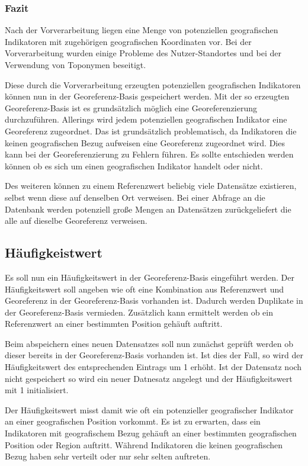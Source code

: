 			\subsubsection{Fazit} 

				Nach der Vorverarbeitung liegen eine Menge von potenziellen geografischen Indikatoren mit zugehörigen geografischen Koordinaten vor.
				Bei der Vorverarbeitung wurden einige Probleme des Nutzer-Standortes und bei der Verwendung von Toponymen beseitigt.

				Diese durch die Vorverarbeitung erzeugten potenziellen geografischen Indikatoren können nun in der Georeferenz-Basis gespeichert werden.
				Mit der so erzeugten Georeferenz-Basis ist es grundsätzlich möglich eine Georeferenzierung durchzuführen. 
				Allerings wird jedem potenziellen geografischen Indikator eine Georeferenz zugeordnet.
				Das ist grundsätzlich problematisch, da Indikatoren die keinen geografischen Bezug aufweisen eine Georeferenz zugeordnet wird. 
				Dies kann bei der Georeferenzierung zu Fehlern führen.
				Es sollte entschieden werden können ob es sich um einen geografischen Indikator handelt oder nicht. 

				Des weiteren können zu einem Referenzwert beliebig viele Datensätze existieren, selbst wenn diese auf denselben Ort verweisen. 
				Bei einer Abfrage an die Datenbank werden potenziell große Mengen an Datensätzen zurückgeliefert die alle auf dieselbe Georeferenz verweisen.

		\subsection{Häufigkeistwert}

			Es soll nun ein Häufigkeitswert in der Georeferenz-Basis eingeführt werden.
			Der Häufigkeitswert soll angeben wie oft eine Kombination aus Referenzwert und Georeferenz in der Georeferenz-Basis vorhanden ist.
			Dadurch werden Duplikate in der Georeferenz-Basis vermieden.
			Zusätzlich kann ermittelt werden ob ein Referenzwert an einer bestimmten Position gehäuft auftritt.

			Beim abspeichern eines neuen Datensatzes soll nun zunächst geprüft werden ob dieser bereits in der Georeferenz-Basis vorhanden ist. 
			Ist dies der Fall, so wird der Häufigkeitswert des entsprechenden Eintrags um 1 erhöht.
			Ist der Datensatz noch nicht gespeichert so wird ein neuer Datnesatz angelegt und der Häufigkeitswert mit 1 initialisiert.

			Der Häufigkeitswert misst damit wie oft ein potenzieller geografischer Indikator an einer geografischen Position vorkommt.
			Es ist zu erwarten, dass ein Indikatoren mit geografischem Bezug gehäuft an einer bestimmten geografischen Position oder Region auftritt.
			Während Indikatoren die keinen geografischen Bezug haben sehr verteilt oder nur sehr selten auftreten. 


